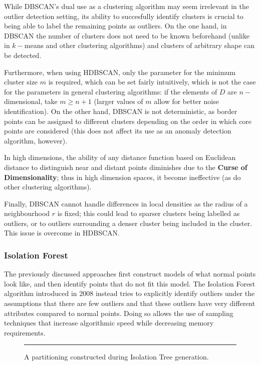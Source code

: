 While DBSCAN's dual use as a clustering algorithm may seem irrelevant in the outlier detection setting,
its ability to succesfully identify clusters is crucial to being able to label the remaining points as outliers.
\newl 
On the one hand, in DBSCAN the number of clusters does not need to be known beforehand (unlike in $k-$means and other clustering algorithms) and clusters of arbitrary shape can be detected. \par Furthermore, when using HDBSCAN, only the parameter for the minimum cluster size $m$ is required, which can be set fairly intuitively, which is not the case for the parameters in general clustering algorithms: if the elements of $D$ are $n-$dimensional, take $m\geq n+1$ (larger values of $m$ allow for better noise identification).
\newl On the other hand, DBSCAN is not deterministic, as border points can be assigned to different clusters depending on the order in which core points are considered (this does not affect its use as an anomaly detection algorithm, however).
\par In high dimensions, the ability of any distance function based on Euclidean distance to distinguish near and distant points diminishes due to the \textbf{Curse of Dimensionality}; thus in high dimension spaces, it  become ineffective (as do  other clustering algorithms). \par  Finally, DBSCAN cannot handle differences in local densities as the radius of a neighbourhood $r$ is fixed; this could lead to sparser clusters being labelled as outliers, or to outliers surrounding a denser cluster being included in the cluster.
This issue is overcome in HDBSCAN.

\subsubsection*{Isolation Forest}
The previously discussed approaches first construct models of what normal points look like, and then identify points that do not fit this model.
The Isolation Forest algorithm \cite{A15} introduced in 2008 instead tries to explicitly identify outliers under the assumptions that there are few outliers and that these outliers have very different attributes compared to normal points. Doing so allows the use of sampling techniques that increase algorithmic speed while decreasing memory requirements.
\begin{figure}[b]
\hrule \vspace{0.4cm}\centering
{}
\caption{A partitioning constructed during Isolation Tree generation.}
\label{isolationtree}
\end{figure}

